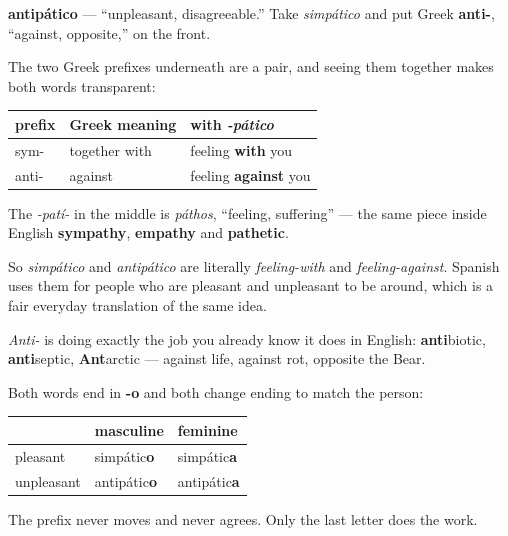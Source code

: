 \begin{cousinweb}
\textbf{antipático} — \textquotedblleft{}unpleasant, disagreeable.\textquotedblright{} Take \emph{simpático} and put Greek \textbf{anti-}, \textquotedblleft{}against, opposite,\textquotedblright{} on the front.

The two Greek prefixes underneath are a pair, and seeing them together makes both words transparent:

\noindent
\begin{tabularx}{\linewidth}{@{}>{\raggedright\arraybackslash}X>{\raggedright\arraybackslash}X>{\raggedright\arraybackslash}X@{}}
\toprule
\textbf{prefix} & \textbf{Greek meaning} & \textbf{with \emph{-pático}} \\
\midrule
sym- & together with & feeling \textbf{with} you \\
anti- & against & feeling \textbf{against} you \\
\bottomrule
\end{tabularx}

The \emph{-patí-} in the middle is \emph{páthos}, \textquotedblleft{}feeling, suffering\textquotedblright{} — the same piece inside English \textbf{sympathy}, \textbf{empathy} and \textbf{pathetic}.

So \emph{simpático} and \emph{antipático} are literally \emph{feeling-with} and \emph{feeling-against}. Spanish uses them for people who are pleasant and unpleasant to be around, which is a fair everyday translation of the same idea.

\emph{Anti-} is doing exactly the job you already know it does in English: \textbf{anti}biotic, \textbf{anti}septic, \textbf{Ant}arctic — against life, against rot, opposite the Bear.
\end{cousinweb}

\begin{grammarlens}[title={What you've built}]
Both words end in \textbf{-o} and both change ending to match the person:

\noindent
\begin{tabularx}{\linewidth}{@{}>{\raggedright\arraybackslash}X>{\raggedright\arraybackslash}X>{\raggedright\arraybackslash}X@{}}
\toprule
\textbf{} & \textbf{masculine} & \textbf{feminine} \\
\midrule
pleasant & simpátic\textbf{o} & simpátic\textbf{a} \\
unpleasant & antipátic\textbf{o} & antipátic\textbf{a} \\
\bottomrule
\end{tabularx}

The prefix never moves and never agrees. Only the last letter does the work.
\end{grammarlens}

